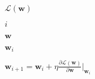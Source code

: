 \documentclass[10pt]{article}
\begin{document}
$\mathcal{L}(\mathbf{w})$

$i$

$\mathbf{w}$

$\mathbf{w}_{i}$

$\mathbf{w}_{i+1} = \mathbf{w}_{i} + \eta \frac{\partial \mathcal{L}(\mathbf{w})}{\partial \mathbf{w}}\bigg|_{\mathbf{w}_{i}}$
\end{document}
